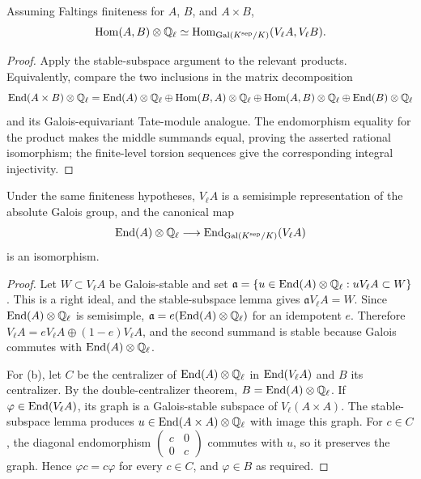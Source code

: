 \begin{corollary}
\label{cor:milne-tate-hom-finiteness}

Assuming Faltings finiteness for $A$, $B$, and $A\times B$,
\[
 \operatorname{Hom}(A,B)\otimes\mathbb{Q}_\ell
 \simeq \operatorname{Hom}_{\operatorname{Gal}(K^{\mathrm{sep}}/K)}(V_\ell A,V_\ell B).
\]
\end{corollary}

\begin{proof}

Apply the stable-subspace argument to the relevant products.  Equivalently,
compare the two inclusions in the matrix decomposition
\[
\operatorname{End}(A\times B)\otimes\mathbb{Q}_\ell
 =\operatorname{End}(A)\otimes\mathbb{Q}_\ell\oplus\operatorname{Hom}(B,A)\otimes\mathbb{Q}_\ell
 \oplus\operatorname{Hom}(A,B)\otimes\mathbb{Q}_\ell\oplus\operatorname{End}(B)\otimes\mathbb{Q}_\ell
\]
and its Galois-equivariant Tate-module analogue.  The endomorphism equality
for the product makes the middle summands equal, proving the asserted rational
isomorphism; the finite-level torsion sequences give the corresponding
integral injectivity.

\end{proof}


\begin{theorem}
\label{thm:milne-tate-semisimplicity}

Under the same finiteness hypotheses, $V_\ell A$ is a semisimple representation
of the absolute Galois group, and the canonical map
\[
\operatorname{End}(A)\otimes\mathbb{Q}_\ell\longrightarrow
\operatorname{End}_{\operatorname{Gal}(K^{\mathrm{sep}}/K)}(V_\ell A)
\]
is an isomorphism.
\end{theorem}

\begin{proof}

Let $W\subset V_\ell A$ be Galois-stable and set
$\mathfrak a=\{u\in\operatorname{End}(A)\otimes\mathbb{Q}_\ell:uV_\ell A\subset W\}$.  This is a
right ideal, and the stable-subspace lemma gives
$\mathfrak aV_\ell A=W$.  Since $\operatorname{End}(A)\otimes\mathbb{Q}_\ell$ is semisimple,
$\mathfrak a=e(\operatorname{End}(A)\otimes\mathbb{Q}_\ell)$ for an idempotent $e$.  Therefore
$V_\ell A=eV_\ell A\oplus(1-e)V_\ell A$, and the second summand is stable
because Galois commutes with $\operatorname{End}(A)\otimes\mathbb{Q}_\ell$.

For (b), let $C$ be the centralizer of $\operatorname{End}(A)\otimes\mathbb{Q}_\ell$ in
$\operatorname{End}(V_\ell A)$ and $B$ its centralizer.  By the double-centralizer theorem,
$B=\operatorname{End}(A)\otimes\mathbb{Q}_\ell$.  If $\varphi\in\operatorname{End}(V_\ell A)$, its graph is a
Galois-stable subspace of $V_\ell(A\times A)$.  The stable-subspace lemma
produces $u\in\operatorname{End}(A\times A)\otimes\mathbb{Q}_\ell$ with image this graph.  For
$c\in C$, the diagonal endomorphism
$\left(\begin{smallmatrix}c&0\\0&c\end{smallmatrix}\right)$ commutes with $u$,
so it preserves the graph.  Hence $\varphi c=c\varphi$ for every $c\in C$,
and $\varphi\in B$ as required.

\end{proof}


